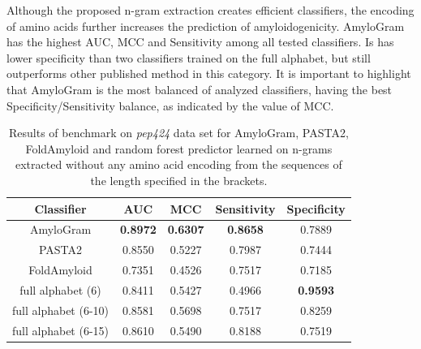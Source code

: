 \documentclass{bioinfo}
\begin{document}
  Although the proposed n-gram extraction creates efficient classifiers, the 
encoding of amino acids further increases the prediction of amyloidogenicity. 
AmyloGram has the highest AUC, MCC and Sensitivity among all tested classifiers. 
Is has lower specificity than two classifiers trained on the full alphabet, but 
still outperforms other published method in this category. It is important to 
highlight that AmyloGram is the most balanced of analyzed classifiers, having 
the best Specificity/Sensitivity balance, as indicated by the value of MCC.

\begin{table}[ht]
\centering
\caption{Results of benchmark on \textit{pep424} data set for AmyloGram, 
PASTA2, FoldAmyloid and random forest predictor learned on n-grams extracted 
without any amino acid encoding from the sequences of the length specified in 
the brackets.} 
\label{tab:bench_summary}
\begin{tabular}{ccccc}
  \toprule
Classifier & AUC & MCC & Sensitivity & Specificity \\ 
  \midrule
AmyloGram & \textbf{0.8972} & \textbf{0.6307} & \textbf{0.8658} & 0.7889 \\ 
   \rowcolor[gray]{0.85}PASTA2 & 0.8550 & 0.5227 & 0.7987 & 0.7444 \\ 
  FoldAmyloid & 0.7351 & 0.4526 & 0.7517 & 0.7185 \\ 
   \rowcolor[gray]{0.85}full alphabet (6) & 0.8411 & 0.5427 & 0.4966 & 
\textbf{0.9593} \\ 
  full alphabet (6-10) & 0.8581 & 0.5698 & 0.7517 & 0.8259 \\ 
   \rowcolor[gray]{0.85}full alphabet (6-15) & 0.8610 & 0.5490 & 0.8188 & 0.7519 
\\ 
   \bottomrule
\end{tabular}
\end{table}











%
%
\end{document}
